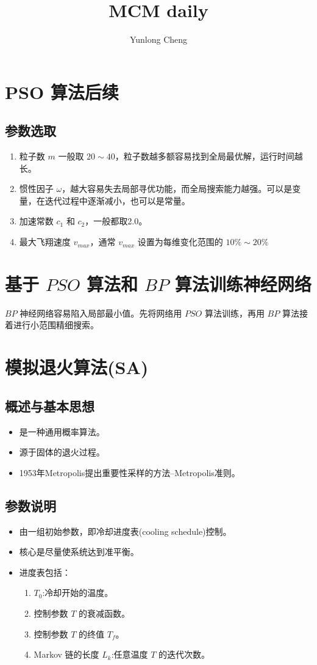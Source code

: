 \documentclass[12pt,a4paper]{article}
\title{MCM daily}
\author{Yunlong Cheng}
\begin{document}
\maketitle
\section{PSO 算法后续}
\subsection{参数选取}
\begin{enumerate}
  \item 粒子数 $m$ 一般取 $20\sim 40$，粒子数越多额容易找到全局最优解，运行时间越长。
  \item 惯性因子 $\omega$，越大容易失去局部寻优功能，而全局搜索能力越强。可以是变量，在迭代过程中逐渐减小，也可以是常量。
  \item 加速常数 $c_1$ 和 $c_2$，一般都取2.0。
  \item 最大飞翔速度 $v_{max}$，通常 $v_{max}$ 设置为每维变化范围的 $10\%\sim 20\%$
\end{enumerate}
\section{基于 $PSO$ 算法和 $BP$ 算法训练神经网络}
$BP$ 神经网络容易陷入局部最小值。先将网络用 $PSO$ 算法训练，再用 $BP$ 算法接着进行小范围精细搜索。
\section{模拟退火算法(SA)}
\subsection{概述与基本思想}
\begin{itemize}
  \item 是一种通用概率算法。
  \item 源于固体的退火过程。
  \item 1953年Metropolis提出重要性采样的方法--Metropolis准则。
\end{itemize}
\subsection{参数说明}
\begin{itemize}
  \item 由一组初始参数，即冷却进度表(cooling schedule)控制。
  \item 核心是尽量使系统达到准平衡。
  \item 进度表包括：
  \begin{enumerate}
    \item $T_0$:冷却开始的温度。
    \item 控制参数 $T$ 的衰减函数。
    \item 控制参数 $T$ 的终值 $T_f$。
    \item Markov 链的长度 $L_k$:任意温度 $T$ 的迭代次数。
  \end{enumerate}
\end{itemize}
\end{document}
